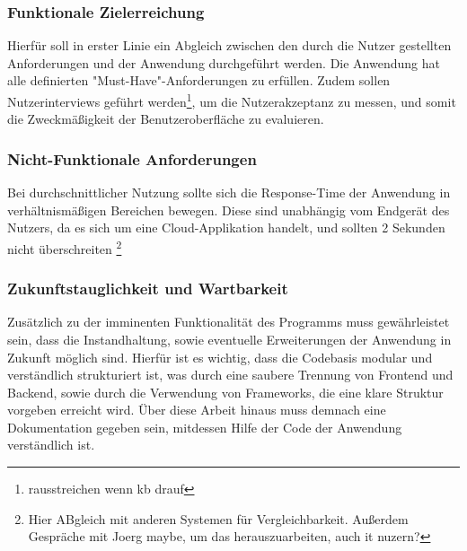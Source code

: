 \subsubsection{Funktionale Zielerreichung}
Hierfür soll in erster Linie ein Abgleich zwischen den durch die Nutzer gestellten Anforderungen und der Anwendung durchgeführt werden. Die Anwendung hat
alle definierten "Must-Have"-Anforderungen zu erfüllen. Zudem sollen Nutzerinterviews geführt werden\footnote{rausstreichen wenn kb drauf}, um die Nutzerakzeptanz 
zu messen, und somit die Zweckmäßigkeit der Benutzeroberfläche zu evaluieren.
\subsubsection{Nicht-Funktionale Anforderungen}
Bei durchschnittlicher Nutzung sollte sich die Response-Time der Anwendung in verhältnismäßigen Bereichen bewegen. Diese sind unabhängig vom Endgerät des Nutzers, da es
sich um eine Cloud-Applikation handelt, und sollten 2 Sekunden nicht überschreiten \footnote{Hier ABgleich mit anderen Systemen für Vergleichbarkeit. Außerdem Gespräche mit Joerg maybe, um das herauszuarbeiten, auch it nuzern?}
\subsubsection{Zukunftstauglichkeit und Wartbarkeit}
Zusätzlich zu der imminenten Funktionalität des Programms muss gewährleistet sein, dass die Instandhaltung, sowie eventuelle Erweiterungen der Anwendung in Zukunft möglich sind.
Hierfür ist es wichtig, dass die Codebasis modular und verständlich strukturiert ist, was durch eine saubere Trennung von Frontend und Backend, sowie durch die Verwendung von Frameworks, die eine klare Struktur vorgeben erreicht wird.
Über diese Arbeit hinaus muss demnach eine Dokumentation gegeben sein, mitdessen Hilfe der Code der Anwendung verständlich ist.


